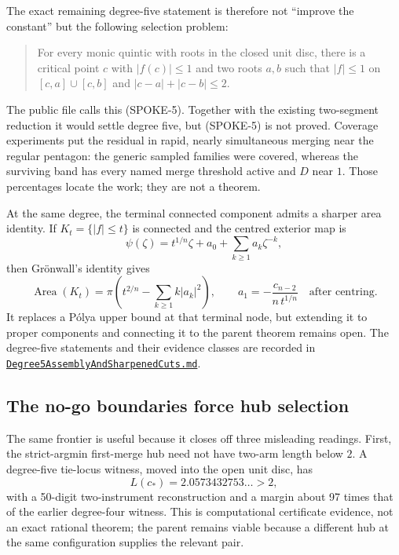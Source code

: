\documentclass[11pt]{article}
\begin{document}
The exact remaining degree-five statement is therefore not ``improve the
constant'' but the following selection problem:
\begin{quote}
For every monic quintic with roots in the closed unit disc, there is a
critical point $c$ with $|f(c)|\le1$ and two roots $a,b$ such that
$|f|\le1$ on $[c,a]\cup[c,b]$ and
$|c-a|+|c-b|\le2$.
\end{quote}
The public file calls this (SPOKE-5).  Together with the existing
two-segment reduction it would settle degree five, but (SPOKE-5) is not
proved.  Coverage experiments put the residual in rapid, nearly simultaneous
merging near the regular pentagon: the generic sampled families were covered,
whereas the surviving band has every named merge threshold active and
$D$ near $1$.  Those percentages locate the work; they are not a theorem.

At the same degree, the terminal connected component admits a sharper area
identity.  If $K_t=\{|f|\le t\}$ is connected and the centred exterior map is
\[
 \psi(\zeta)=t^{1/n}\zeta+a_0+
 \sum_{k\ge1}a_k\zeta^{-k},
\]
then Gr\"onwall's identity gives
\[
 \operatorname{Area}(K_t)=\pi\left(t^{2/n}-
 \sum_{k\ge1}k|a_k|^2\right),
 \qquad
 a_1=-\frac{c_{n-2}}{n\,t^{1/n}}
 \quad\text{after centring}.
\]
It replaces a P\'olya upper bound at that terminal node, but extending it to
proper components and connecting it to the parent theorem remains open.  The
degree-five statements and their evidence classes are recorded in
\href{https://github.com/wcook04/plectis-erdos/blob/f214a6b45528dc5eefe20ffadc35f2e981627d4c/research_corpus/Erdos1041/Degree5AssemblyAndSharpenedCuts.md}{\texttt{Degree5AssemblyAndSharpenedCuts.md}}.

\subsection*{The no-go boundaries force hub selection}

The same frontier is useful because it closes off three misleading readings.
First, the strict-argmin first-merge hub need not have two-arm length below
$2$.  A degree-five tie-locus witness, moved into the open unit disc, has
\[
 L(c_*)=2.0573432753\ldots>2,
\]
with a 50-digit two-instrument reconstruction and a margin about 97 times
that of the earlier degree-four witness.  This is computational certificate
evidence, not an exact rational theorem; the parent remains viable because a
different hub at the same configuration supplies the relevant pair.
\end{document}
